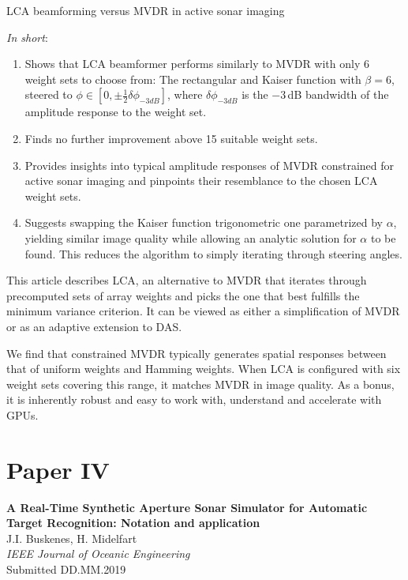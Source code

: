LCA beamforming versus MVDR in active sonar imaging

\textit{In short}:
\begin{enumerate}
\item Shows that LCA beamformer performs similarly to MVDR with only 6 weight sets to choose from: The rectangular and Kaiser function with $\beta=6$, steered to $\phi\in[0,\pm\frac{1}{2}\delta{\phi_{-3dB}}]$, where $\delta{\phi_{-3dB}}$ is the $-3$\,dB bandwidth of the amplitude response to the weight set.
\item Finds no further improvement above 15 suitable weight sets.
\item Provides insights into typical amplitude responses of MVDR constrained for active sonar imaging and pinpoints their resemblance to the chosen LCA weight sets. 
\item Suggests swapping the Kaiser function trigonometric one parametrized by $\alpha$, yielding similar image quality while allowing an analytic solution for $\alpha$ to be found. This reduces the algorithm to simply iterating through steering angles.
\end{enumerate}

This article describes LCA, an alternative to MVDR that iterates through precomputed sets of array weights and picks the one that best fulfills the minimum variance criterion. It can be viewed as either a simplification of MVDR or as an adaptive extension to DAS.

We find that constrained MVDR typically generates spatial responses between that of uniform weights and Hamming weights. When LCA is configured with six weight sets covering this range, it matches MVDR in image quality. As a bonus, it is inherently robust and easy to work with, understand and accelerate with GPUs.


\section{Paper IV}\label{sec:paperIV} %
\textbf{A Real-Time Synthetic Aperture Sonar Simulator for Automatic Target Recognition: Notation and application}\\
J.I. Buskenes, H. Midelfart\\
\textit{IEEE Journal of Oceanic Engineering}\\
Submitted DD.MM.2019%

